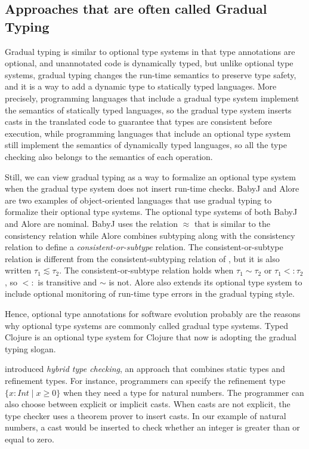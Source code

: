 \documentclass[preprint]{sig-alternate}
\begin{document}
\subsection{Approaches that are often called Gradual Typing}

Gradual typing is similar to optional type systems in that type
annotations are optional, and unannotated code is dynamically
typed, but unlike optional type systems, gradual typing changes 
the run-time semantics to preserve type safety, and it is a way to
add a dynamic type to statically typed languages. 
More precisely, programming languages that include a gradual type
system implement the semantics of statically typed languages, so
the gradual type system inserts casts in the translated code to
guarantee that types are consistent before execution, while
programming languages that include an optional type system still
implement the semantics of dynamically typed languages, so all
the type checking also belongs to the semantics of each operation.

Still, we can view gradual typing as a way to formalize an optional
type system when the gradual type system does not insert run-time
checks.
BabyJ \citep{anderson2002babyj} and Alore \citep{lehtosalo2011alore}
are two examples of object-oriented languages that use gradual
typing to formalize their optional type systems.
The optional type systems of both BabyJ and Alore are nominal.
BabyJ uses the relation $\approx$ that is similar to the consistency
relation while Alore combines  subtyping along with the consistency
relation to define a \textit{consistent-or-subtype} relation.
The consistent-or-subtype relation is different from the
consistent-subtyping relation of \citet{siek2007objects}, but it is
also written $\tau_{1} \lesssim \tau_{2}$.
The consistent-or-subtype relation holds when $\tau_{1} \sim \tau_{2}$
or $\tau_{1} <: \tau_{2}$, so $<:$ is transitive and $\sim$ is not.
Alore also extends its optional type system to include optional
monitoring of run-time type errors in the gradual typing style.

Hence, optional type annotations for software evolution probably are
the reasons why optional type systems are commonly called
gradual type systems.
Typed Clojure \citep{bonnaire-sergeant2012typed-clojure} is an
optional type system for Clojure that now is adopting the
gradual typing slogan.

\citet{flanagan2006htc} introduced \textit{hybrid type checking},
an approach that combines static types and refinement types.
For instance, programmers can specify the refinement type
$\{x:Int \;|\; x \ge 0\}$ when they need a type for natural numbers.
The programmer can also choose between explicit or implicit casts.
When casts are not explicit, the type checker uses a theorem prover
to insert casts.
In our example of natural numbers, a cast would be inserted to check
whether an integer is greater than or equal to zero.
\end{document}
